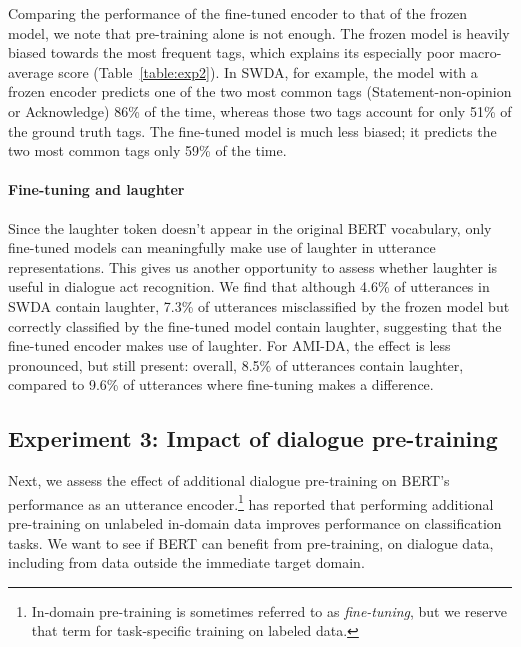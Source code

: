 \documentclass[11pt,a4paper]{article}
\begin{document}
Comparing the performance of the fine-tuned encoder to that of the frozen model, we note that pre-training alone is not enough.
The frozen model is heavily biased towards the most frequent tags, which explains its especially poor macro-average score (Table~\ref{table:exp2}).
In SWDA, for example, the model with a frozen encoder predicts one of the two most common tags (Statement-non-opinion or Acknowledge) 86\% of the time, whereas those two
tags account for only 51\% of the ground truth tags.
The fine-tuned model is much less biased; it predicts the two most common tags only 59\% of the time.




\paragraph{Fine-tuning and laughter}
Since the laughter token doesn't appear in the original BERT vocabulary, only fine-tuned models can meaningfully make use of laughter in utterance representations. 
This gives us another opportunity to assess whether laughter is useful in dialogue act recognition.
We find that although 4.6\% of utterances in SWDA contain laughter, 
7.3\% of utterances misclassified by the frozen model but correctly classified by the fine-tuned model contain laughter, 
suggesting that the fine-tuned encoder makes use of laughter. 
For AMI-DA, the effect is less pronounced, but still present: 
overall, 8.5\% of utterances contain laughter, 
compared to 9.6\% of utterances where fine-tuning makes a difference. 

\subsection{Experiment 3: Impact of dialogue pre-training} \label{sec:experiment3} %

Next, we assess the effect of additional dialogue pre-training on BERT's performance as an utterance encoder.\footnote{
In-domain pre-training is sometimes referred to as \textit{fine-tuning}, but we reserve that term for task-specific training on labeled data.}
\citet{sunHowFineTuneBERT2019} has reported that performing additional pre-training on unlabeled in-domain data improves performance on classification tasks. 
We want to see if BERT can benefit from pre-training, on dialogue data, including from data outside the immediate target domain.
\end{document}
